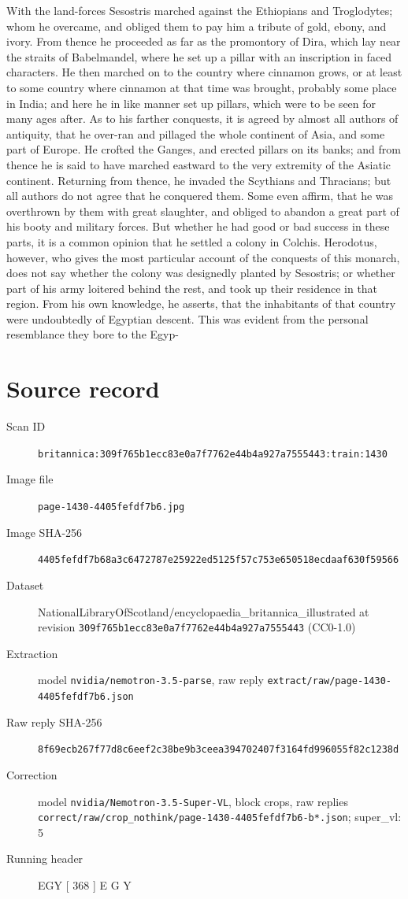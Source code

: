 \documentclass{article}
\begin{document}
With the land-forces Sesostris marched against the Ethiopians and Troglodytes; whom he overcame, and obliged them to pay him a tribute of gold, ebony, and ivory. From thence he proceeded as far as the promontory of Dira, which lay near the straits of Babelmandel, where he set up a pillar with an inscription in faced characters. He then marched on to the country where cinnamon grows, or at least to some country where cinnamon at that time was brought, probably some place in India; and here he in like manner set up pillars, which were to be seen for many ages after. As to his farther conquests, it is agreed by almost all authors of antiquity, that he over-ran and pillaged the whole continent of Asia, and some part of Europe. He crofted the Ganges, and erected pillars on its banks; and from thence he is said to have marched eastward to the very extremity of the Asiatic continent. Returning from thence, he invaded the Scythians and Thracians; but all authors do not agree that he conquered them. Some even affirm, that he was overthrown by them with great slaughter, and obliged to abandon a great part of his booty and military forces. But whether he had good or bad success in these parts, it is a common opinion that he settled a colony in Colchis. Herodotus, however, who gives the most particular account of the conquests of this monarch, does not say whether the colony was designedly planted by Sesostris; or whether part of his army loitered behind the rest, and took up their residence in that region. From his own knowledge, he asserts, that the inhabitants of that country were undoubtedly of Egyptian descent. This was evident from the personal resemblance they bore to the Egyp-


\section*{Source record}
\begin{description}
\item[Scan ID] \texttt{britannica:309f765b1ecc83e0a7f7762e44b4a927a7555443:train:1430}
\item[Image file] \texttt{page-1430-4405fefdf7b6.jpg}
\item[Image SHA-256] \texttt{4405fefdf7b68a3c6472787e25922ed5125f57c753e650518ecdaaf630f59566}
\item[Dataset] NationalLibraryOfScotland/encyclopaedia\_britannica\_illustrated at revision \texttt{309f765b1ecc83e0a7f7762e44b4a927a7555443} (CC0-1.0)
\item[Extraction] model \texttt{nvidia/nemotron-3.5-parse}, raw reply \texttt{extract/raw/page-1430-4405fefdf7b6.json}
\item[Raw reply SHA-256] \texttt{8f69ecb267f77d8c6eef2c38be9b3ceea394702407f3164fd996055f82c1238d}
\item[Correction] model \texttt{nvidia/Nemotron-3.5-Super-VL}, block crops, raw replies \texttt{correct/raw/crop\_nothink/page-1430-4405fefdf7b6-b*.json}; super\_vl: 5
\item[Running header] EGY [ 368 ] E G Y
\end{description}
\end{document}

